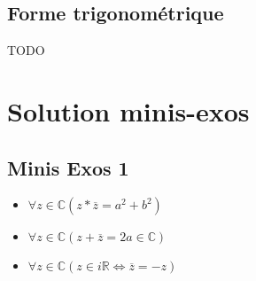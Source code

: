 \documentclass{article}
\begin{document}
\subsection{Forme trigonométrique}
TODO








\section{Solution minis-exos}
\subsection{Minis Exos 1}
\begin{itemize}
  \item $\forall z \in \mathbb{C}(z*\overline{z} = a^{2}+b^{2})$
  \item $\forall z \in \mathbb{C}(z + \overline{z} = 2a \in \mathbb{C})$
  \item $\forall z \in \mathbb{C}(z \in i\mathbb{R} \Leftrightarrow \overline{z} = -z)$
\end{itemize}
\end{document}
